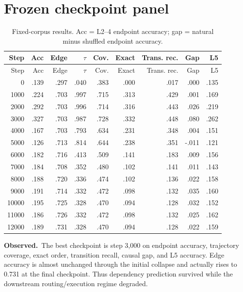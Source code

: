 \documentclass[10pt]{article}
\newcommand{\obs}{\textbf{Observed.}\ }
\begin{document}
\section{Frozen checkpoint panel}
\begin{longtable}{rrrrrrrrr}
\caption{Fixed-corpus results. Acc = L2--4 endpoint accuracy; gap = natural
minus shuffled endpoint accuracy.}\\
\toprule Step&Acc&Edge&$\tau$&Cov.&Exact&Trans. rec.&Gap&L5\\\midrule\endfirsthead
\toprule Step&Acc&Edge&$\tau$&Cov.&Exact&Trans. rec.&Gap&L5\\\midrule\endhead
0&.139&.297&.040&.383&.000&.017&.000&.135\\
1000&.224&.703&.997&.715&.313&.429&.001&.169\\
2000&.292&.703&.996&.714&.316&.443&.026&.219\\
3000&.327&.703&.987&.728&.332&.448&.080&.262\\
4000&.167&.703&.793&.634&.231&.348&.004&.151\\
5000&.126&.713&.814&.644&.238&.351&-.011&.121\\
6000&.182&.716&.413&.509&.141&.183&.009&.156\\
7000&.184&.708&.352&.480&.102&.141&.011&.143\\
8000&.188&.720&.336&.474&.102&.136&.022&.158\\
9000&.191&.714&.332&.472&.098&.132&.035&.160\\
10000&.195&.725&.328&.470&.094&.128&.032&.152\\
11000&.186&.726&.332&.472&.098&.132&.025&.162\\
12000&.189&.731&.328&.470&.094&.128&.022&.159\\
\bottomrule
\end{longtable}

\obs The best checkpoint is step 3,000 on endpoint accuracy, trajectory
coverage, exact order, transition recall, causal gap, and L5 accuracy. Edge
accuracy is almost unchanged through the initial collapse and actually rises
to 0.731 at the final checkpoint. Thus dependency prediction survived while
the downstream routing/execution regime degraded.
\end{document}
